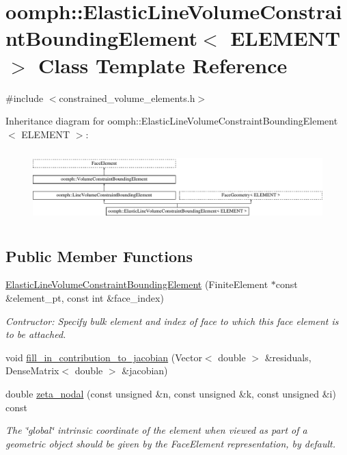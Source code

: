 \hypertarget{classoomph_1_1ElasticLineVolumeConstraintBoundingElement}{}\section{oomph\+:\+:Elastic\+Line\+Volume\+Constraint\+Bounding\+Element$<$ E\+L\+E\+M\+E\+NT $>$ Class Template Reference}
\label{classoomph_1_1ElasticLineVolumeConstraintBoundingElement}


{\ttfamily \#include $<$constrained\+\_\+volume\+\_\+elements.\+h$>$}

Inheritance diagram for oomph\+:\+:Elastic\+Line\+Volume\+Constraint\+Bounding\+Element$<$ E\+L\+E\+M\+E\+NT $>$\+:\begin{figure}[H]
\begin{center}
\leavevmode
\includegraphics[height=2.786070cm]{classoomph_1_1ElasticLineVolumeConstraintBoundingElement}
\end{center}
\end{figure}
\subsection*{Public Member Functions}
\begin{DoxyCompactItemize}
\item 
\hyperlink{classoomph_1_1ElasticLineVolumeConstraintBoundingElement_a4759433aaab9f854126480581e4f08d5}{Elastic\+Line\+Volume\+Constraint\+Bounding\+Element} (Finite\+Element $\ast$const \&element\+\_\+pt, const int \&face\+\_\+index)
\begin{DoxyCompactList}\small\item\em Contructor\+: Specify bulk element and index of face to which this face element is to be attached. \end{DoxyCompactList}\item 
void \hyperlink{classoomph_1_1ElasticLineVolumeConstraintBoundingElement_a6b9670b4a995765e0b2793a3cab05966}{fill\+\_\+in\+\_\+contribution\+\_\+to\+\_\+jacobian} (Vector$<$ double $>$ \&residuals, Dense\+Matrix$<$ double $>$ \&jacobian)
\item 
double \hyperlink{classoomph_1_1ElasticLineVolumeConstraintBoundingElement_a99fee8b9d2bea757909174f26415139b}{zeta\+\_\+nodal} (const unsigned \&n, const unsigned \&k, const unsigned \&i) const
\begin{DoxyCompactList}\small\item\em The \char`\"{}global\char`\"{} intrinsic coordinate of the element when viewed as part of a geometric object should be given by the Face\+Element representation, by default. \end{DoxyCompactList}\end{DoxyCompactItemize}
